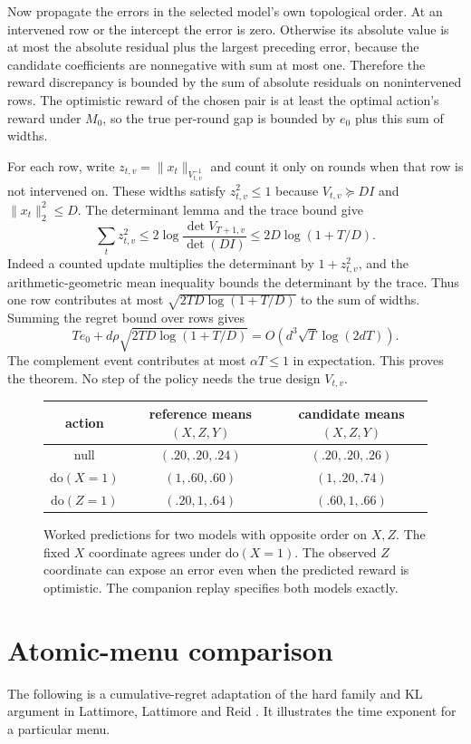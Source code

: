\documentclass[11pt,a4paper]{amsart}
\begin{document}
Now propagate the errors in the selected model's own topological order. At an intervened row or the intercept the error is zero. Otherwise its absolute value is at most the absolute residual plus the largest preceding error, because the candidate coefficients are nonnegative with sum at most one. Therefore the reward discrepancy is bounded by the sum of absolute residuals on nonintervened rows. The optimistic reward of the chosen pair is at least the optimal action's reward under $M_0$, so the true per-round gap is bounded by $e_0$ plus this sum of widths.

For each row, write $z_{t,v}=\|x_t\|_{V_{t,v}^{-1}}$ and count it only on rounds when that row is not intervened on. These widths satisfy $z_{t,v}^2\leq1$ because $V_{t,v}\succeq D I$ and $\|x_t\|_2^2\leq D$. The determinant lemma and the trace bound give
\[
 \sum_t z_{t,v}^2\leq 2\log\frac{\det V_{T+1,v}}{\det(DI)}
                  \leq 2D\log(1+T/D).
\]
Indeed a counted update multiplies the determinant by $1+z_{t,v}^2$, and the arithmetic-geometric mean inequality bounds the determinant by the trace. Thus one row contributes at most $\sqrt{2TD\log(1+T/D)}$ to the sum of widths. Summing the regret bound over rows gives
\[
          T e_0+d\rho\sqrt{2TD\log(1+T/D)}
          =O(d^3\sqrt{T}\log(2dT)).
\]
The complement event contributes at most $\alpha T\leq1$ in expectation. This proves the theorem. No step of the policy needs the true design $V_{t,v}$.

\begin{figure}[t]
\centering
\begin{tabular}{c|c|c}
 action & reference means $(X,Z,Y)$ & candidate means $(X,Z,Y)$\\ \hline
 null & $(.20,.20,.24)$ & $(.20,.20,.26)$\\
 $\mathrm{do}(X=1)$ & $(1,.60,.60)$ & $(1,.20,.74)$\\
 $\mathrm{do}(Z=1)$ & $(.20,1,.64)$ & $(.60,1,.66)$
\end{tabular}
\caption{Worked predictions for two models with opposite order on $X,Z$. The fixed $X$ coordinate agrees under $\mathrm{do}(X=1)$. The observed $Z$ coordinate can expose an error even when the predicted reward is optimistic. The companion replay specifies both models exactly.}
\end{figure}

\section{Atomic-menu comparison}
The following is a cumulative-regret adaptation of the hard family and KL argument in Lattimore, Lattimore and Reid \cite[Theorem 2 and its proof]{lattimore}. It illustrates the time exponent for a particular menu.
\end{document}
